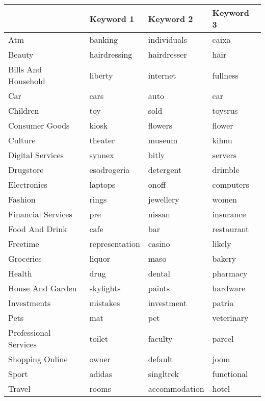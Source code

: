\begin{tabular}{llll}
\toprule
{} &       Keyword 1 &      Keyword 2 &   Keyword 3 \\
\midrule
Atm                   &         banking &    individuals &       caixa \\
Beauty                &    hairdressing &    hairdresser &        hair \\
Bills And Household   &         liberty &       internet &    fullness \\
Car                   &            cars &           auto &         car \\
Children              &             toy &           sold &     toysrus \\
Consumer Goods        &           kiosk &        flowers &      flower \\
Culture               &         theater &         museum &       kihnu \\
Digital Services      &          synnex &          bitly &     servers \\
Drugstore             &     esodrogeria &      detergent &     drimble \\
Electronics           &         laptops &          onoff &   computers \\
Fashion               &           rings &      jewellery &       women \\
Financial Services    &             pre &         nissan &   insurance \\
Food And Drink        &            cafe &            bar &  restaurant \\
Freetime              &  representation &         casino &      likely \\
Groceries             &          liquor &           maso &      bakery \\
Health                &            drug &         dental &    pharmacy \\
House And Garden      &       skylights &         paints &    hardware \\
Investments           &        mistakes &     investment &      patria \\
Pets                  &             mat &            pet &  veterinary \\
Professional Services &          toilet &        faculty &      parcel \\
Shopping Online       &           owner &        default &        joom \\
Sport                 &          adidas &      singltrek &  functional \\
Travel                &           rooms &  accommodation &       hotel \\
\bottomrule
\end{tabular}
